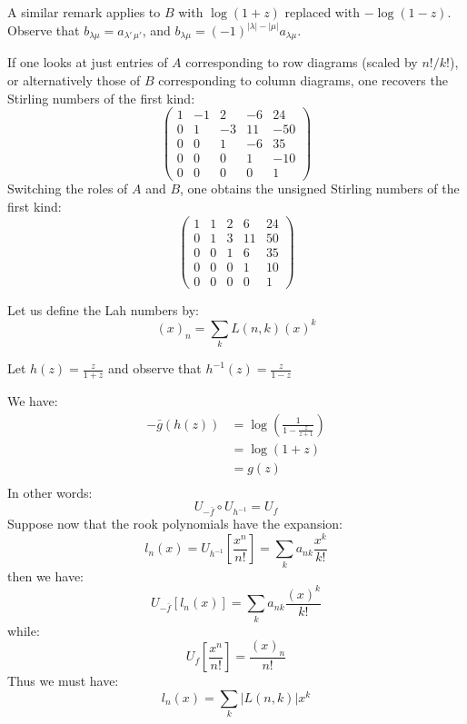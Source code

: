 \documentclass[12pt,dvips]{amsart}
\begin{document}
A similar remark applies to $B$ with $\log(1+z)$ replaced with $-\log(1-z)$.
Observe that $b_{\lambda \mu} = a_{\lambda'\, \mu'}$, 
and 
$b_{\lambda \mu} = (-1)^{|\lambda| - |\mu|} a_{\lambda  \mu}$.

If one looks at just entries of $A$ corresponding to row diagrams (scaled by $n! / k!$), or alternatively those of $B$ corresponding to column diagrams, one recovers the Stirling numbers of the first kind:
$$ \left(
\begin{array}{rrrrr}
 1 & -1 & 2 & -6 & 24 \\
 0 & 1 & -3 & 11 & -50 \\
 0 & 0 & 1 & -6 & 35 \\
 0 & 0 & 0 & 1 & -10 \\
 0 & 0 & 0 & 0 & 1
\end{array}
\right) $$
Switching the roles of $A$ and $B$,
one obtains the unsigned Stirling numbers of the first kind:
$$ \left(
\begin{array}{rrrrr}
 1 & 1 & 2 & 6 & 24 \\
 0 & 1 & 3 & 11 & 50 \\
 0 & 0 & 1 & 6 & 35 \\
 0 & 0 & 0 & 1 & 10 \\
 0 & 0 & 0 & 0 & 1
\end{array}
\right) $$

\par\bigskip



\bigskip
\noindent
Let us define the Lah numbers by:
$$ (x)_n = \sum_k L(n,k) (x)^k $$

\par\bigskip
Let $h(z) = \frac{z}{1+z}$ and observe that $h^{-1}(z) = \frac{z}{1-z}$ 

We have:
\begin{align*}
-\bar{g}(h(z))   &=  \log \left (\frac{1}{1 - \frac{z}{z+1}} \right) \\
& =  \log(1+z) \\
& =  g(z) \\
\end{align*}
In other words:
$$ U_{-\bar{f}} \circ U_{h^{-1}} = U_{f} $$
Suppose now that the rook polynomials have the expansion:
$$ l_n(x) = U_{h^{-1}} \left [ \frac{x^n}{n!} \right ] = \sum_k a_{nk} \frac{x^k}{k!} $$
then we have:
$$ U_{-\bar{f}} \left[ l_n(x) \right ] = \sum_k a_{nk} \frac{(x)^k}{k!} $$
while:
$$ U_{f} \left [ \frac{x^n}{n!} \right ] = \frac{(x)_n}{n!} $$
Thus we must have:
$$l_n(x) = \sum_k |L(n,k)| x^k $$
\end{document}
